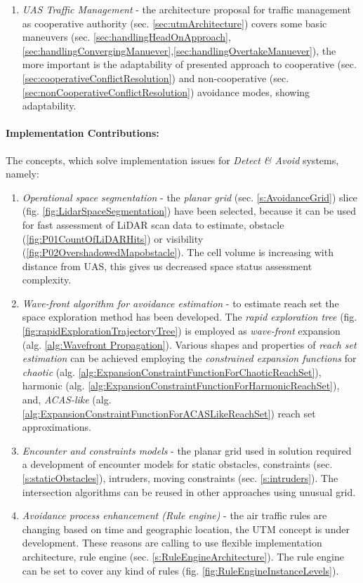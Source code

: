 \begin{enumerate}
    \item \emph{UAS Traffic Management} - the architecture proposal for traffic management  as cooperative authority (sec. \ref{sec:utmArchitecture}) covers some basic maneuvers (sec. \ref{sec:handlingHeadOnApproach}, \ref{sec:handlingConvergingManuever},\ref{sec:handlingOvertakeManuever}), the more important is the adaptability of presented approach to cooperative (sec. \ref{sec:cooperativeConflictResolution}) and non-cooperative (sec. \ref{sec:nonCooperativeConflictResolution}) avoidance modes, showing adaptability. 
\end{enumerate}

\paragraph{Implementation Contributions:} The concepts, which solve implementation issues for \emph{Detect \& Avoid} systems, namely:

\begin{enumerate}
    \item \emph{Operational space segmentation} - the \emph{planar grid} (sec. \ref{s:AvoidanceGrid}) slice (fig. \ref{fig:LidarSpaceSegmentation}) have been selected, because it can be used for fast assessment of LiDAR scan data to estimate, obstacle (\ref{fig:P01CountOfLiDARHits}) or visibility (\ref{fig:P02OvershadowedMapobstacle}). The cell volume is increasing with distance from UAS, this gives us decreased space status assessment complexity.
    
    \item \emph{Wave-front algorithm for avoidance estimation} - to estimate reach set the space exploration method has been developed. The \emph{rapid exploration tree} (fig. \ref{fig:rapidExplorationTrajectoryTree}) is employed as \emph{wave-front} expansion (alg. \ref{alg:Wavefront Propagation}). Various shapes and properties of \emph{reach set estimation} can be achieved employing the \emph{constrained expansion functions} for \emph{chaotic} (alg. \ref{alg:ExpansionConstraintFunctionForChaoticReachSet}), harmonic (alg. \ref{alg:ExpansionConstraintFunctionForHarmonicReachSet}), and, \emph{ACAS-like} (alg. \ref{alg:ExpansionConstraintFunctionForACASLikeReachSet}) reach set approximations.
    
    \item \emph{Encounter and constraints models} - the planar grid used in solution required a development of encounter models for static obstacles, constraints (sec. \ref{s:staticObstacles}), intruders, moving constraints (sec. \ref{s:intruders}). The intersection algorithms can be reused in other approaches using unusual grid.
    
    \item \emph{Avoidance process enhancement (Rule engine)} - the air traffic rules are changing based on time and geographic location, the UTM concept is under development. These reasons are calling to use flexible implementation architecture, rule engine (sec. \ref{s:RuleEngineArchitecture}). The rule engine can be set to cover any kind of rules (fig. \ref{fig:RuleEngineInstanceLevels}).
\end{enumerate}